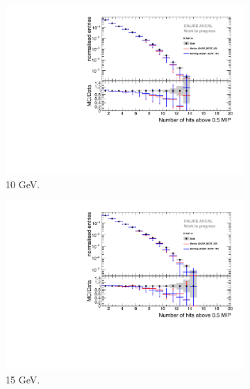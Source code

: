 \begin{figure}[htbp!]
	\begin{subfigure}[t]{0.45\textwidth}
		\centering
		\includegraphics[width=1\textwidth]{chap5/fig_AHCAL_timing/Electrons/Comparison_SimData_Electrons_nHits_10GeV.pdf}
		\caption{10 GeV.}\label{fig:elec_sim_data_nHits_10GeV}
	\end{subfigure}
	\hfill
	\begin{subfigure}[t]{0.45\textwidth}
		\centering
		\includegraphics[width=1\textwidth]{chap5/fig_AHCAL_timing/Electrons/Comparison_SimData_Electrons_nHits_15GeV.pdf}
		\caption{15 GeV.}\label{fig:elec_sim_data_nHits_15GeV}
	\end{subfigure}
	\hfill
	\begin{subfigure}[t]{0.45\textwidth}
		\centering

\end{subfigure}
\end{figure}
